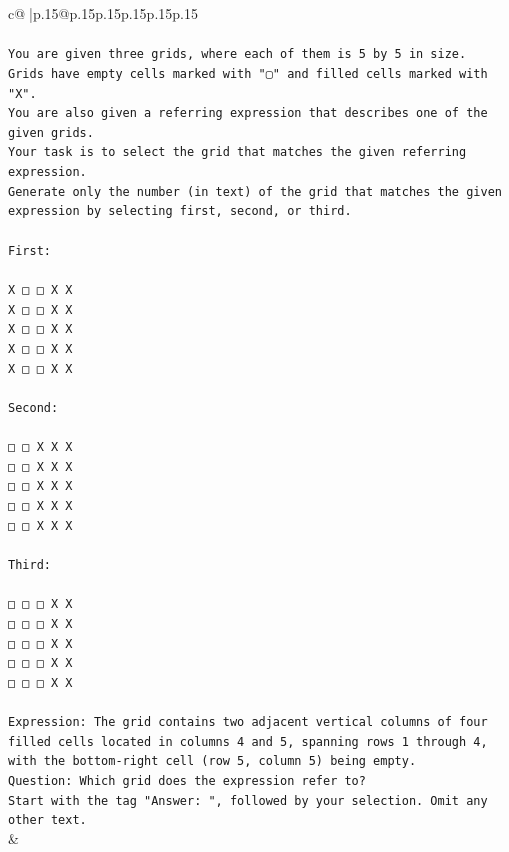 \documentclass{article}
\begin{document}
{\begin{supertabular}{c@{$\;$}|p{.15\linewidth}@{}p{.15\linewidth}p{.15\linewidth}p{.15\linewidth}p{.15\linewidth}p{.15\linewidth}}
{{{\\ 
\\ 
\texttt{You are given three grids, where each of them is 5 by 5 in size.} \\
\texttt{Grids have empty cells marked with "▢" and filled cells marked with "X".} \\
\texttt{You are also given a referring expression that describes one of the given grids.} \\
\texttt{Your task is to select the grid that matches the given referring expression.} \\
\texttt{Generate only the number (in text) of the grid that matches the given expression by selecting first, second, or third.} \\
\\ 
\texttt{First:} \\
\\ 
\texttt{X □ □ X X} \\
\texttt{X □ □ X X} \\
\texttt{X □ □ X X} \\
\texttt{X □ □ X X} \\
\texttt{X □ □ X X} \\
\\ 
\texttt{Second:} \\
\\ 
\texttt{□ □ X X X} \\
\texttt{□ □ X X X} \\
\texttt{□ □ X X X} \\
\texttt{□ □ X X X} \\
\texttt{□ □ X X X} \\
\\ 
\texttt{Third:} \\
\\ 
\texttt{□ □ □ X X} \\
\texttt{□ □ □ X X} \\
\texttt{□ □ □ X X} \\
\texttt{□ □ □ X X} \\
\texttt{□ □ □ X X} \\
\\ 
\texttt{Expression: The grid contains two adjacent vertical columns of four filled cells located in columns 4 and 5, spanning rows 1 through 4, with the bottom{-}right cell (row 5, column 5) being empty.} \\
\texttt{Question: Which grid does the expression refer to?} \\
\texttt{Start with the tag "Answer: ", followed by your selection. Omit any other text.} \\
            }
        }
    }
    & \\ \\


\end{supertabular}}
\end{document}
